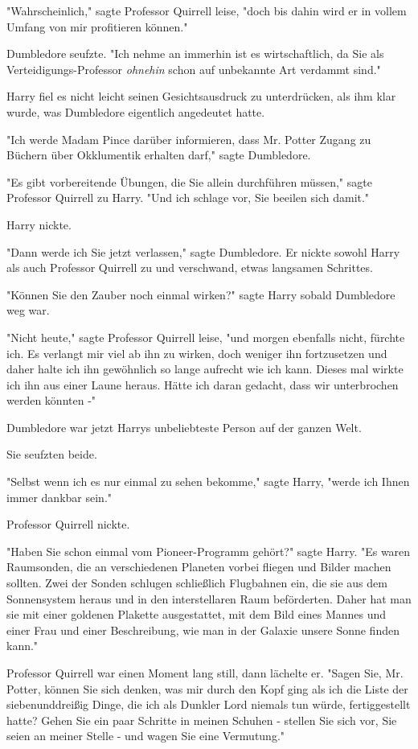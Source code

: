 {"Wahrscheinlich," sagte Professor Quirrell leise, "doch bis dahin wird er in vollem Umfang von mir profitieren können."

Dumbledore seufzte. "Ich nehme an immerhin ist es wirtschaftlich, da Sie als Verteidigungs-Professor \emph{ohnehin} schon auf unbekannte Art verdammt sind."

Harry fiel es nicht leicht seinen Gesichtsausdruck zu unterdrücken, als ihm klar wurde, was Dumbledore eigentlich angedeutet hatte.

"Ich werde Madam Pince darüber informieren, dass Mr. Potter Zugang zu Büchern über Okklumentik erhalten darf," sagte Dumbledore.

"Es gibt vorbereitende Übungen, die Sie allein durchführen müssen," sagte Professor Quirrell zu Harry. "Und ich schlage vor, Sie beeilen sich damit."

Harry nickte.

"Dann werde ich Sie jetzt verlassen," sagte Dumbledore. Er nickte sowohl Harry als auch Professor Quirrell zu und verschwand, etwas langsamen Schrittes.

"Können Sie den Zauber noch einmal wirken?" sagte Harry sobald Dumbledore weg war.

"Nicht heute," sagte Professor Quirrell leise, "und morgen ebenfalls nicht, fürchte ich. Es verlangt mir viel ab ihn zu wirken, doch weniger ihn fortzusetzen und daher halte ich ihn gewöhnlich so lange aufrecht wie ich kann. Dieses mal wirkte ich ihn aus einer Laune heraus. Hätte ich daran gedacht, dass wir unterbrochen werden könnten -"

Dumbledore war jetzt Harrys unbeliebteste Person auf der ganzen Welt.

Sie seufzten beide.

"Selbst wenn ich es nur einmal zu sehen bekomme," sagte Harry, "werde ich Ihnen immer dankbar sein."

Professor Quirrell nickte.

"Haben Sie schon einmal vom Pioneer-Programm gehört?" sagte Harry. "Es waren Raumsonden, die an verschiedenen Planeten vorbei fliegen und Bilder machen sollten. Zwei der Sonden schlugen schließlich Flugbahnen ein, die sie aus dem Sonnensystem heraus und in den interstellaren Raum beförderten. Daher hat man sie mit einer goldenen Plakette ausgestattet, mit dem Bild eines Mannes und einer Frau und einer Beschreibung, wie man in der Galaxie unsere Sonne finden kann."

Professor Quirrell war einen Moment lang still, dann lächelte er. "Sagen Sie, Mr. Potter, können Sie sich denken, was mir durch den Kopf ging als ich die Liste der siebenunddreißig Dinge, die ich als Dunkler Lord niemals tun würde, fertiggestellt hatte? Gehen Sie ein paar Schritte in meinen Schuhen - stellen Sie sich vor, Sie seien an meiner Stelle - und wagen Sie eine Vermutung."

}
